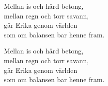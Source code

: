 \begin{lyrics}
Mellan is och hård betong,\\
mellan regn och torr savann,\\
går Erika genom världen\\
som om balansen bar henne fram.


Mellan is och hård betong,\\
mellan regn och torr savann,\\
går Erika genom världen\\
som om balansen bar henne fram.


\end{lyrics}

